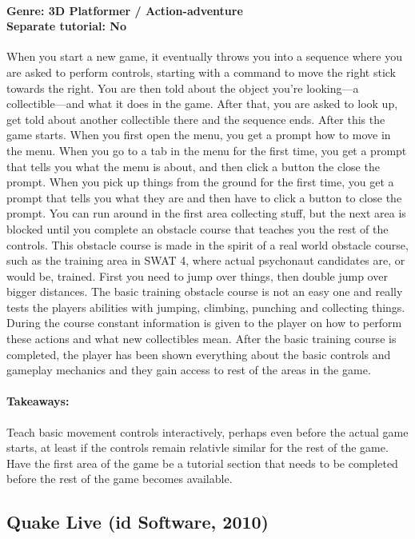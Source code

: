 \paragraph{Genre: 3D Platformer / Action-adventure \\ Separate tutorial: No \\}
When you start a new game, it eventually throws you into a sequence where you are asked to perform controls, starting with a command to move the right stick towards the right. You are then told about the object you're looking---a collectible---and what it does in the game. After that, you are asked to look up, get told about another collectible there and the sequence ends. After this the game starts.
When you first open the menu, you get a prompt how to move in the menu.
When you go to a tab in the menu for the first time, you get a prompt that tells you what the menu is about, and then click a button the close the prompt.
When you pick up things from the ground for the first time, you get a prompt that tells you what they are and then have to click a button to close the prompt.
You can run around in the first area collecting stuff, but the next area is blocked until you complete an obstacle course that teaches you the rest of the controls. This obstacle course is made in the spirit of a real world obstacle course, such as the training area in SWAT 4, where actual psychonaut candidates are, or would be, trained. First you need to jump over things, then double jump over bigger distances.
The basic training obstacle course is not an easy one and really tests the players abilities with jumping, climbing, punching and collecting things. During the course constant information is given to the player on how to perform these actions and what new collectibles mean.
After the basic training course is completed, the player has been shown everything about the basic controls and gameplay mechanics and they gain access to rest of the areas in the game.
\paragraph{Takeaways:}
Teach basic movement controls interactively, perhaps even before the actual game starts, at least if the controls remain relativle similar for the rest of the game.
Have the first area of the game be a tutorial section that needs to be completed before the rest of the game becomes available.

\subsection{Quake Live (id Software, 2010)}

